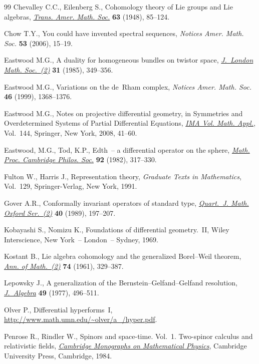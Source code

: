 \documentclass[pdftex]{sigma}
\begin{document}
\begin{thebibliography}{99}
Chevalley C.C., Eilenberg S.,
Cohomology theory of Lie groups and Lie algebras,
\href{http://dx.doi.org/10.2307/1990637}{{\it Trans. Amer. Math. Soc.}} {\bf 63} (1948), 85--124.

Chow T.Y.,
You could have invented spectral sequences,
{\it Notices Amer. Math. Soc.} {\bf 53} (2006), 15--19.

Eastwood M.G.,
A duality for homogeneous bundles on twistor space,
\href{http://dx.doi.org/10.1112/jlms/s2-31.2.349}{{\it J.~London Math. Soc.~(2)}} {\bf 31} (1985), 349--356.

Eastwood M.G.,
Variations on the de~Rham complex,
{\it Notices Amer. Math. Soc.} {\bf 46} (1999), 1368--1376.

Eastwood M.G.,
Notes on projective dif\/ferential geometry,
in Symmetries and Overdetermined Systems of Partial Dif\/ferential Equations,
\href{http://dx.doi.org/10.1007/978-0-387-73831-4_3}{{\it IMA Vol. Math. Appl.}}, Vol.~144, Springer, New York, 2008,  41--60.

Eastwood, M.G., Tod, K.P.,
Edth~-- a dif\/ferential operator on the sphere,
\href{http://dx.doi.org/10.1017/S0305004100059971}{{\it Math. Proc. Cambridge Philos. Soc.}} {\bf 92} (1982), 317--330.

Fulton W., Harris J.,
Representation theory, {\it Graduate Texts in Mathematics}, Vol.~129, Springer-Verlag, New York, 1991.

Gover A.R.,
Conformally invariant operators of standard type,
\href{http://dx.doi.org/10.1093/qmath/40.2.197}{{\it Quart.~J. Math. Oxford Ser.~(2)}} {\bf 40} (1989), 197--207.

Kobayashi S., Nomizu K.,
Foundations of dif\/ferential geometry.~II,
Wiley Interscience, New York~-- London~-- Sydney, 1969.

Kostant B.,
Lie algebra cohomology and the generalized Borel--Weil theorem,
\href{http://dx.doi.org/10.2307/1970237}{{\it Ann. of Math.~(2)}} {\bf 74} (1961), 329--387.

Lepowsky J.,
A generalization of the Bernstein--Gelfand--Gelfand resolution,
\href{http://dx.doi.org/10.1016/0021-8693(77)90254-X}{{\it J.~Algebra}} {\bf 49} (1977), 496--511.

Olver P.,
Dif\/ferential hyperforms~I,
\url{http://www.math.umn.edu/~olver/a_/hyper.pdf}.

Penrose R., Rindler W.,
Spinors and space-time. Vol.~1. Two-spinor calculus and relativistic f\/ields,
\href{http://dx.doi.org/10.1017/CBO9780511564048}{{\it Cambridge Monographs on Mathematical Physics}}, Cambridge University Press, Cambridge, 1984.


\end{thebibliography}
\end{document}

